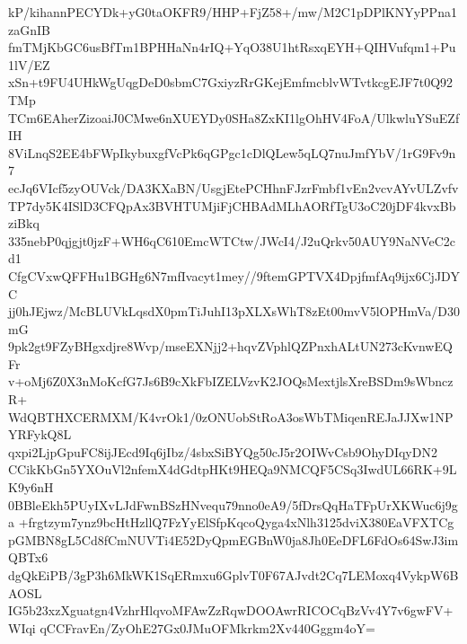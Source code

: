 kP/kihannPECYDk+yG0taOKFR9/HHP+FjZ58+/mw/M2C1pDPlKNYyPPna1zaGnIB
fmTMjKbGC6usBfTm1BPHHaNn4rIQ+YqO38U1htRsxqEYH+QIHVufqm1+Pu1lV/EZ
xSn+t9FU4UHkWgUqgDeD0sbmC7GxiyzRrGKejEmfmcblvWTvtkcgEJF7t0Q92TMp
TCm6EAherZizoaiJ0CMwe6nXUEYDy0SHa8ZxKI1lgOhHV4FoA/UlkwluYSuEZfIH
8ViLnqS2EE4bFWpIkybuxgfVcPk6qGPgc1cDlQLew5qLQ7nuJmfYbV/1rG9Fv9n7
ecJq6VIcf5zyOUVck/DA3KXaBN/UsgjEtePCHhnFJzrFmbf1vEn2vcvAYvULZvfv
TP7dy5K4ISlD3CFQpAx3BVHTUMjiFjCHBAdMLhAORfTgU3oC20jDF4kvxBbziBkq
335nebP0qjgjt0jzF+WH6qC610EmcWTCtw/JWcI4/J2uQrkv50AUY9NaNVeC2cd1
CfgCVxwQFFHu1BGHg6N7mfIvacyt1mey//9ftemGPTVX4DpjfmfAq9ijx6CjJDYC
jj0hJEjwz/McBLUVkLqsdX0pmTiJuhI13pXLXsWhT8zEt00mvV5lOPHmVa/D30mG
9pk2gt9FZyBHgxdjre8Wvp/mseEXNjj2+hqvZVphlQZPnxhALtUN273cKvnwEQFr
v+oMj6Z0X3nMoKcfG7Js6B9cXkFbIZELVzvK2JOQsMextjlsXreBSDm9sWbnczR+
WdQBTHXCERMXM/K4vrOk1/0zONUobStRoA3osWbTMiqenREJaJJXw1NPYRFykQ8L
qxpi2LjpGpuFC8ijJEcd9Iq6jIbz/4sbxSiBYQg50cJ5r2OIWvCsb9OhyDIqyDN2
CCikKbGn5YXOuVl2nfemX4dGdtpHKt9HEQa9NMCQF5CSq3IwdUL66RK+9LK9y6nH
0BBleEkh5PUyIXvLJdFwnBSzHNvequ79nno0eA9/5fDrsQqHaTFpUrXKWuc6j9ga
+frgtzym7ynz9bcHtHzllQ7FzYyElSfpKqcoQyga4xNlh3125dviX380EaVFXTCg
pGMBN8gL5Cd8fCmNUVTi4E52DyQpmEGBnW0ja8Jh0EeDFL6FdOs64SwJ3imQBTx6
dgQkEiPB/3gP3h6MkWK1SqERmxu6GplvT0F67AJvdt2Cq7LEMoxq4VykpW6BAOSL
IG5b23xzXguatgn4VzhrHlqvoMFAwZzRqwDOOAwrRICOCqBzVv4Y7v6gwFV+WIqi
qCCFravEn/ZyOhE27Gx0JMuOFMkrkm2Xv440Gggm4oY=
